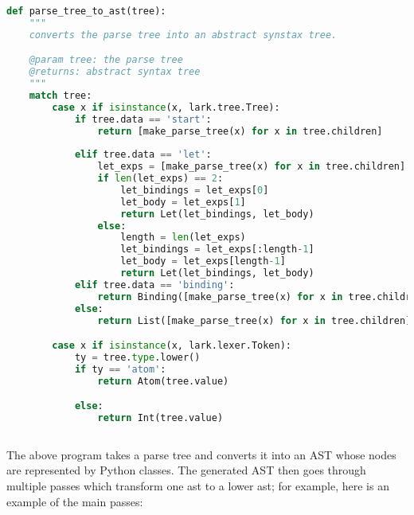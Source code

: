 \documentclass{amsbook}
\begin{document}
\begin{lstlisting}[language=python]
def parse_tree_to_ast(tree):
    """
    converts the parse tree into an abstract synstax tree.

    @param tree: the parse tree
    @returns: abstract syntax tree
    """
    match tree:
        case x if isinstance(x, lark.tree.Tree):
            if tree.data == 'start':
                return [make_parse_tree(x) for x in tree.children]
            
            elif tree.data == 'let':
                let_exps = [make_parse_tree(x) for x in tree.children]
                if len(let_exps) == 2:
                    let_bindings = let_exps[0]
                    let_body = let_exps[1]
                    return Let(let_bindings, let_body)
                else:
                    length = len(let_exps)
                    let_bindings = let_exps[:length-1]
                    let_body = let_exps[length-1]
                    return Let(let_bindings, let_body)
            elif tree.data == 'binding':
                return Binding([make_parse_tree(x) for x in tree.children])
            else:
                return List([make_parse_tree(x) for x in tree.children])

        case x if isinstance(x, lark.lexer.Token):
            ty = tree.type.lower()
            if ty == 'atom':
                return Atom(tree.value)

            else:
                return Int(tree.value)
    
\end{lstlisting}
The above program takes a parse tree and converts it into an AST whose nodes are represented by Python classes. The generated AST then goes through multiple passes which transform one ast to a lower ast; for example, here is an example of the main passes:
\end{document}
